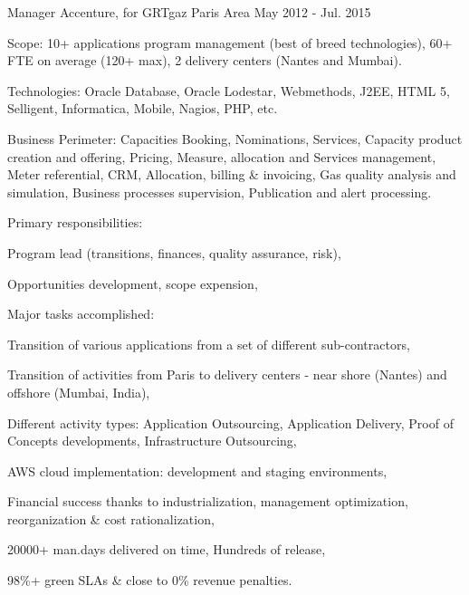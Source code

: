 \begin{cventries}
  \cventry
    {Manager} %
    {Accenture, for GRTgaz} %
    {Paris Area} %
    {May 2012 - Jul. 2015} %
    {
      \begin{cvitems} %
        \item {Scope: 10+ applications program management (best of breed technologies), 60+ FTE on average (120+ max), 2 delivery centers (Nantes and Mumbai).}
        \item {Technologies: Oracle Database, Oracle Lodestar, Webmethods, J2EE, HTML 5, Selligent, Informatica, Mobile, Nagios, PHP, etc.}
        \item {Business Perimeter: Capacities Booking, Nominations, Services, Capacity product creation and offering, Pricing, Measure, allocation and Services management, Meter referential, CRM, Allocation, billing \& invoicing, Gas quality analysis and simulation, Business processes supervision, Publication and alert processing.}
        \item {Primary responsibilities:}
        \begin{cvsubitems}
          \item {Program lead (transitions, finances, quality assurance, risk), }
          \item {Opportunities development, scope expension,}
        \end{cvsubitems}
        \item {Major tasks accomplished:}
        \begin{cvsubitems}
          \item {Transition of various applications from a set of different sub-contractors,}
          \item {Transition of activities from Paris to delivery centers - near shore (Nantes) and offshore (Mumbai, India),}
          \item {Different activity types: Application Outsourcing, Application Delivery, Proof of Concepts developments, Infrastructure Outsourcing,}
          \item {AWS cloud implementation: development and staging environments,}
          \item {Financial success thanks to industrialization, management optimization, reorganization \& cost rationalization,}
          \item {20000+ man.days delivered on time, Hundreds of release,}
          \item {98\%+ green SLAs \& close to 0\% revenue penalties.}

\end{cvsubitems}
\end{cvitems}}
\end{cventries}
